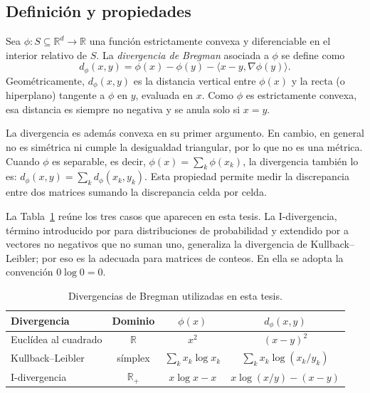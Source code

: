 \subsection{Definición y propiedades}

Sea $\phi : S \subseteq \mathbb{R}^d \to \mathbb{R}$ una función estrictamente
convexa y diferenciable en el interior relativo de $S$. La \emph{divergencia de
Bregman} asociada a $\phi$ se define como
\begin{equation}\label{eq:bregman}
  d_\phi(x, y) = \phi(x) - \phi(y) - \langle x - y, \nabla\phi(y) \rangle .
\end{equation}
Geométricamente, $d_\phi(x,y)$ es la distancia vertical entre $\phi(x)$ y la recta
(o hiperplano) tangente a $\phi$ en $y$, evaluada en $x$. Como $\phi$ es
estrictamente convexa, esa distancia es siempre no negativa y se anula solo si
$x = y$.

La divergencia es además convexa en su primer argumento. En cambio, en general no
es simétrica ni cumple la desigualdad triangular, por lo que no es una métrica.
Cuando $\phi$ es separable, es decir, $\phi(x) = \sum_k \phi(x_k)$, la divergencia
también lo es: $d_\phi(x, y) = \sum_k d_\phi(x_k, y_k)$. Esta propiedad permite
medir la discrepancia entre dos matrices sumando la discrepancia celda por celda.

La Tabla~\ref{tab:bregman} reúne los tres casos que aparecen en esta tesis. La
I-divergencia, término introducido por \cite{Csiszar1975} para distribuciones de
probabilidad y extendido por \cite{Csiszar1991} a vectores no negativos que no
suman uno, generaliza la divergencia de Kullback--Leibler; por eso es la adecuada
para matrices de conteos. En ella se adopta la convención $0 \log 0 = 0$.

\begin{table}[ht]
  \centering
  {\footnotesize
  \begin{tabular}{@{}lccc@{}}
    \toprule
    \textbf{Divergencia} & \textbf{Dominio} & $\phi(x)$ & $d_\phi(x,y)$ \\
    \midrule
    Euclídea al cuadrado & $\mathbb{R}$ & $x^2$ & $(x-y)^2$ \\
    Kullback--Leibler & símplex & $\sum_k x_k \log x_k$ & $\sum_k x_k \log (x_k/y_k)$ \\
    I-divergencia & $\mathbb{R}_{+}$ & $x \log x - x$ & $x \log (x/y) - (x - y)$ \\
    \bottomrule
  \end{tabular}
  }
  \caption{Divergencias de Bregman utilizadas en esta tesis.}
  \label{tab:bregman}
\end{table}

